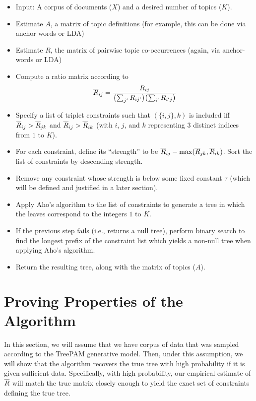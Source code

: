 \documentclass{article}
\theoremstyle{definition}
\begin{document}
\begin{itemize}
  \item Input: A corpus of documents ($X$) and a desired number of topics ($K$).
  \item Estimate $A$, a matrix of topic definitions (for example, this can be done via anchor-words or LDA)
  \item Estimate $R$, the matrix of pairwise topic co-occurrences (again, via anchor-words or LDA)
  \item Compute a ratio matrix according to
  \begin{align}
  \overline{R}_{ij} = \frac{R_{ij}}{ \bigl( \sum_{j'} R_{ij'} \bigr) \bigl( \sum_{i'} R_{i'j} \bigr) }
  \end{align}
  \item Specify a list of triplet constraints such that $(\{i, j\}, k)$ is included iff $\overline{R}_{ij} > \overline{R}_{jk}$ and $\overline{R}_{ij} > \overline{R}_{ik}$ (with $i$, $j$, and $k$ representing 3 distinct indices from $1$ to $K$).
  \item For each constraint, define its ``strength'' to be $\overline{R}_{ij} - \max(\overline{R}_{jk}, \overline{R}_{ik})$.
        Sort the list of constraints by descending strength.
  \item Remove any constraint whose strength is below some fixed constant $\tau$ (which will be defined and justified in a later section).
  \item Apply Aho's algorithm to the list of constraints to generate a tree in which the leaves correspond to the integers $1$ to $K$.
  \item If the previous step fails (i.e., returns a null tree), perform binary search to find the longest prefix of the constraint list which yields a non-null tree when applying Aho's algorithm.
  \item Return the resulting tree, along with the matrix of topics ($A$).
\end{itemize}

\section{Proving Properties of the Algorithm}

In this section, we will assume that we have corpus of data that was sampled according to the TreePAM generative model.
Then, under this assumption, we will show that the algorithm recovers the true tree with high probability if it is given sufficient data.
Specifically, with high probability, our empirical estimate of $\overline{R}$ will match the true matrix closely enough to yield the exact set of constraints defining the true tree.
\end{document}
